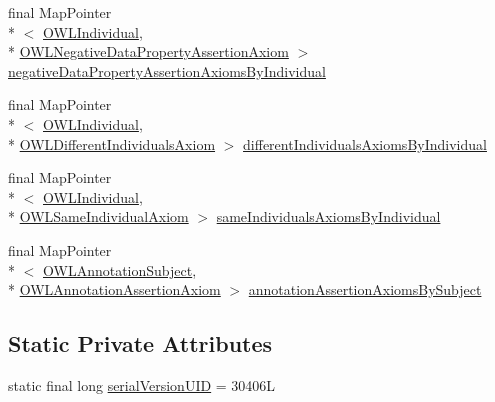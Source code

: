 \begin{DoxyCompactItemize}
\item 
final Map\-Pointer\\*
$<$ \hyperlink{interfaceorg_1_1semanticweb_1_1owlapi_1_1model_1_1_o_w_l_individual}{O\-W\-L\-Individual}, \\*
\hyperlink{interfaceorg_1_1semanticweb_1_1owlapi_1_1model_1_1_o_w_l_negative_data_property_assertion_axiom}{O\-W\-L\-Negative\-Data\-Property\-Assertion\-Axiom} $>$ \hyperlink{classuk_1_1ac_1_1manchester_1_1cs_1_1owl_1_1owlapi_1_1_abstract_internals_impl_acb05fab28b65d8470fb6f6d3955791e9}{negative\-Data\-Property\-Assertion\-Axioms\-By\-Individual}
\item 
final Map\-Pointer\\*
$<$ \hyperlink{interfaceorg_1_1semanticweb_1_1owlapi_1_1model_1_1_o_w_l_individual}{O\-W\-L\-Individual}, \\*
\hyperlink{interfaceorg_1_1semanticweb_1_1owlapi_1_1model_1_1_o_w_l_different_individuals_axiom}{O\-W\-L\-Different\-Individuals\-Axiom} $>$ \hyperlink{classuk_1_1ac_1_1manchester_1_1cs_1_1owl_1_1owlapi_1_1_abstract_internals_impl_a71b33fd2aa125eeb387faa4c18792844}{different\-Individuals\-Axioms\-By\-Individual}
\item 
final Map\-Pointer\\*
$<$ \hyperlink{interfaceorg_1_1semanticweb_1_1owlapi_1_1model_1_1_o_w_l_individual}{O\-W\-L\-Individual}, \\*
\hyperlink{interfaceorg_1_1semanticweb_1_1owlapi_1_1model_1_1_o_w_l_same_individual_axiom}{O\-W\-L\-Same\-Individual\-Axiom} $>$ \hyperlink{classuk_1_1ac_1_1manchester_1_1cs_1_1owl_1_1owlapi_1_1_abstract_internals_impl_a71851a049d56ee5a0a9831b08372479d}{same\-Individuals\-Axioms\-By\-Individual}
\item 
final Map\-Pointer\\*
$<$ \hyperlink{interfaceorg_1_1semanticweb_1_1owlapi_1_1model_1_1_o_w_l_annotation_subject}{O\-W\-L\-Annotation\-Subject}, \\*
\hyperlink{interfaceorg_1_1semanticweb_1_1owlapi_1_1model_1_1_o_w_l_annotation_assertion_axiom}{O\-W\-L\-Annotation\-Assertion\-Axiom} $>$ \hyperlink{classuk_1_1ac_1_1manchester_1_1cs_1_1owl_1_1owlapi_1_1_abstract_internals_impl_a8b51e08aacb5e75c9639e70aec3355dd}{annotation\-Assertion\-Axioms\-By\-Subject}
\end{DoxyCompactItemize}
\subsection*{Static Private Attributes}
\begin{DoxyCompactItemize}
\item 
static final long \hyperlink{classuk_1_1ac_1_1manchester_1_1cs_1_1owl_1_1owlapi_1_1_abstract_internals_impl_a51a08843f83ae661eef43a210e89b56e}{serial\-Version\-U\-I\-D} = 30406\-L
\end{DoxyCompactItemize}


